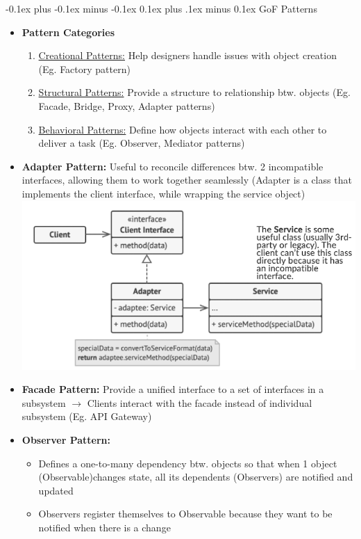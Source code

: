 \documentclass[landscape]{article}
\makeatletter
\renewcommand{\subsection}{\@startsection{subsection}{2}{0mm}%
  {-0.1ex plus -0.1ex minus -0.1ex}%
  {0.1ex plus .1ex minus 0.1ex}%
{\normalfont\scriptsize\bfseries}}
\makeatother
\begin{document}
\begin{multicols*}{5}
    \subsection{GoF Patterns}
    \begin{itemize}
      \item \textbf{Pattern Categories}
      \begin{enumerate}
        \item \underline{Creational Patterns:} Help designers handle issues with object creation (Eg. Factory pattern)
        \item \underline{Structural Patterns:} Provide a structure to relationship btw. objects (Eg. Facade, Bridge, Proxy, Adapter patterns)
        \item \underline{Behavioral Patterns:} Define how objects interact with each other to deliver a task (Eg. Observer, Mediator patterns)
      \end{enumerate}
      \item \textbf{Adapter Pattern:} Useful to reconcile differences btw. 2 incompatible interfaces, allowing them to work together seamlessly (Adapter is a class that implements the client interface, while wrapping the service object)
      \includegraphics[width=0.85\linewidth]{12_adapter_pattern.png}
      \item \textbf{Facade Pattern:} Provide a unified interface to a set of interfaces in a subsystem $\rightarrow$ Clients interact with the facade instead of individual subsystem (Eg. API Gateway)
      \item \textbf{Observer Pattern:}
      \begin{itemize}
        \item Defines a one-to-many dependency btw. objects so that when 1 object (Observable)changes state, all its dependents (Observers) are notified and updated
        \item Observers register themselves to Observable because they want to be notified when there is a change

\end{itemize}
\end{itemize}
\end{multicols*}
\end{document}
